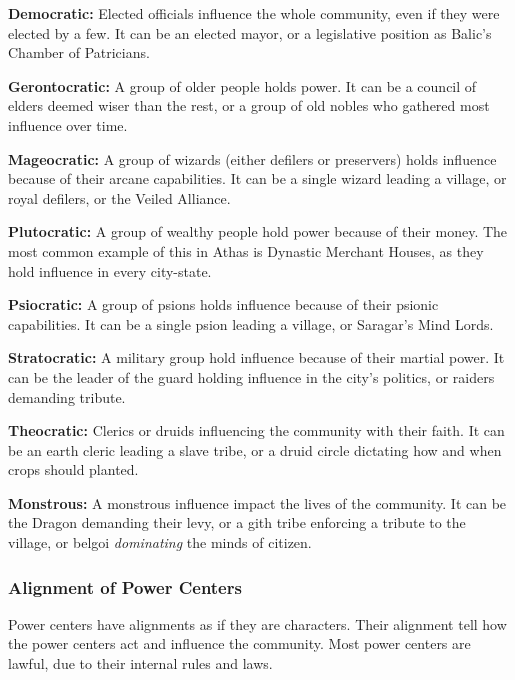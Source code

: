\textbf{Democratic:} Elected officials influence the whole community, even if they were elected by a few. It can be an elected mayor, or a legislative position as Balic's Chamber of Patricians.

\textbf{Gerontocratic:} A group of older people holds power. It can be a council of elders deemed wiser than the rest, or a group of old nobles who gathered most influence over time.

\textbf{Mageocratic:} A group of wizards (either defilers or preservers) holds influence because of their arcane capabilities. It can be a single wizard leading a village, or royal defilers, or the Veiled Alliance.

\textbf{Plutocratic:} A group of wealthy people hold power because of their money. The most common example of this in Athas is Dynastic Merchant Houses, as they hold influence in every city-state.

\textbf{Psiocratic:} A group of psions holds influence because of their psionic capabilities. It can be a single psion leading a village, or Saragar's Mind Lords.

\textbf{Stratocratic:} A military group hold influence because of their martial power. It can be the leader of the guard holding influence in the city's politics, or raiders demanding tribute.

\textbf{Theocratic:} Clerics or druids influencing the community with their faith. It can be an earth cleric leading a slave tribe, or a druid circle dictating how and when crops should planted.

\textbf{Monstrous:} A monstrous influence impact the lives of the community. It can be the Dragon demanding their levy, or a gith tribe enforcing a tribute to the village, or belgoi \emph{dominating} the minds of citizen.


\subsubsection{Alignment of Power Centers}
Power centers have alignments as if they are characters. Their alignment tell how the power centers act and influence the community. Most power centers are lawful, due to their internal rules and laws.


